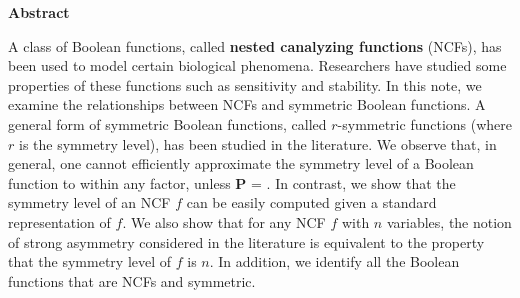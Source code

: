 \vspace*{-0.05in}
\begin{center}
\textbf{Abstract}  %
\end{center}

\smallskip

A class of Boolean functions, 
called \textbf{nested canalyzing functions} (NCFs),
has been used to model certain biological phenomena.
Researchers have studied some properties of these functions
such as sensitivity and stability.
In this note, we examine the relationships between NCFs and symmetric 
Boolean functions. 
A general form of symmetric Boolean functions,
called $r$-symmetric functions (where $r$ is the symmetry level),
has been studied in the literature.
We observe that, in general,
one cannot efficiently approximate the symmetry level of
a Boolean function to within any factor, unless \textbf{P} = \cnp. 
In contrast, we show that the symmetry level of an NCF $f$
can be easily computed given a standard representation of $f$.
We also show that for any NCF $f$ with $n$ variables, the notion of
strong asymmetry considered in the literature is equivalent to
the property that the symmetry level of $f$ is $n$.
In addition, we identify all the Boolean functions that are NCFs 
and symmetric. 
